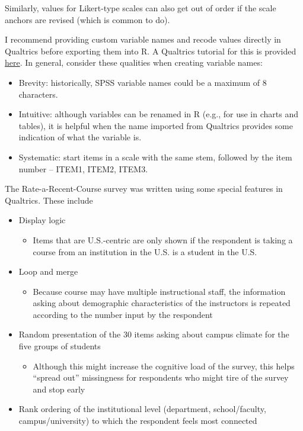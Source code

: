 \documentclass[
  11pt,
]{book}
\providecommand{\tightlist}{%
  \setlength{\itemsep}{0pt}\setlength{\parskip}{0pt}}
\begin{document}
Similarly, values for Likert-type scales can also get out of order if the scale anchors are revised (which is common to do).

I recommend providing custom variable names and recode values directly in Qualtrics before exporting them into R. A Qualtrics tutorial for this is provided \href{https://www.qualtrics.com/support/survey-platform/survey-module/question-options/recode-values/}{here}. In general, consider these qualities when creating variable names:

\begin{itemize}
\tightlist
\item
  Brevity: historically, SPSS variable names could be a maximum of 8 characters.
\item
  Intuitive: although variables can be renamed in R (e.g., for use in charts and tables), it is helpful when the name imported from Qualtrics provides some indication of what the variable is.
\item
  Systematic: start items in a scale with the same stem, followed by the item number -- ITEM1, ITEM2, ITEM3.
\end{itemize}

The Rate-a-Recent-Course survey was written using some special features in Qualtrics. These include

\begin{itemize}
\tightlist
\item
  Display logic

  \begin{itemize}
  \tightlist
  \item
    Items that are U.S.-centric are only shown if the respondent is taking a course from an institution in the U.S. is a student in the U.S.
  \end{itemize}
\item
  Loop and merge

  \begin{itemize}
  \tightlist
  \item
    Because course may have multiple instructional staff, the information asking about demographic characteristics of the instructors is repeated according to the number input by the respondent
  \end{itemize}
\item
  Random presentation of the 30 items asking about campus climate for the five groups of students

  \begin{itemize}
  \tightlist
  \item
    Although this might increase the cognitive load of the survey, this helps ``spread out'' missingness for respondents who might tire of the survey and stop early
  \end{itemize}
\item
  Rank ordering of the institutional level (department, school/faculty, campus/university) to which the respondent feels most connected
\end{itemize}
\end{document}
